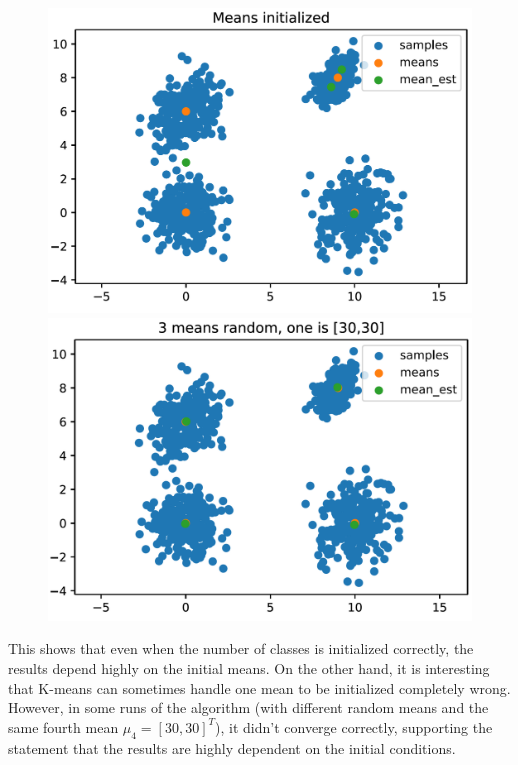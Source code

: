 \documentclass[DIV=12, ngerman, fontsize=12pt, parskip=half]{scrreprt}
\begin{document}
	\begin{figure}[H]
		\begin{minipage}[t]{0.5\textwidth}
			\includegraphics[width=\textwidth]{Task3_means_init4_png}
		\end{minipage}
		\begin{minipage}[t]{0.5\textwidth}
			\includegraphics[width=\textwidth]{Task3_means_init1_png}
		\end{minipage}
	\end{figure}

	This shows that even when the number of classes is initialized correctly, the results depend highly on the initial means. On the other hand, it is interesting that K-means can sometimes handle one mean to be initialized completely wrong. However, in some runs of the algorithm (with different random means and the same fourth mean $\mu_4 = [30,30]^T$), it didn't converge correctly, supporting the statement that the results are highly dependent on the initial conditions.
	



	
\end{document}
